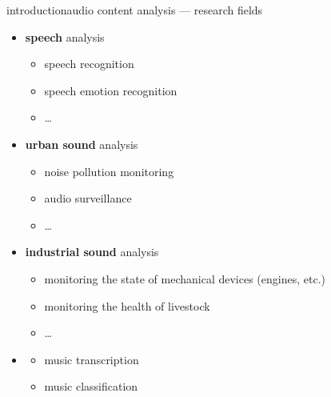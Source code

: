        \begin{frame}{introduction}{audio content analysis --- research fields}
            \vspace{-3mm}
            \begin{itemize}
                \item   \textbf{speech} analysis
                    \begin{itemize}
                        \item   speech recognition
                        \item   speech emotion recognition
                        \item   \ldots
                    \end{itemize}
                \smallskip
                \item<2->   \textbf{urban sound} analysis
                    \begin{itemize}
                        \item   noise pollution monitoring
                        \item   audio surveillance
                        \item   \ldots
                    \end{itemize}
                \smallskip
                \item<3->   \textbf{industrial sound} analysis
                    \begin{itemize}
                        \item   monitoring the state of mechanical devices (engines, etc.)
                        \item   monitoring the health of livestock
                        \item   \ldots
                    \end{itemize}
                \smallskip
                \item<4->   
                    \begin{itemize}
                        \item   music transcription
                        \item   music classification
                    \end{itemize}
            \end{itemize}
        \end{frame}
        
